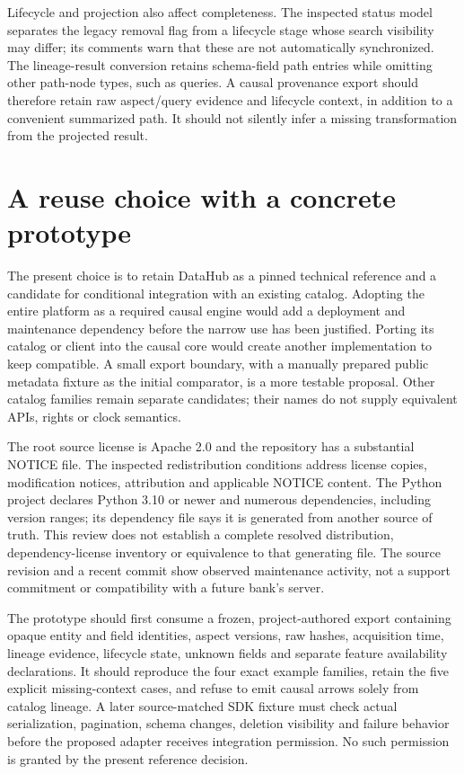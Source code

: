Lifecycle and projection also affect completeness. The inspected status model
separates the legacy removal flag from a lifecycle stage whose search visibility
may differ; its comments warn that these are not automatically synchronized.
The lineage-result conversion retains schema-field path entries while omitting
other path-node types, such as queries. A causal provenance export should
therefore retain raw aspect/query evidence and lifecycle context, in addition
to a convenient summarized path. It should not silently infer a missing
transformation from the projected result. \citep{exec16_dh_primary}

\section{A reuse choice with a concrete prototype}

The present choice is to retain DataHub as a pinned technical reference and
a candidate for conditional integration with an existing catalog. Adopting
the entire platform as a required causal engine would add a deployment and
maintenance dependency before the narrow use has been justified. Porting its
catalog or client into the causal core would create another implementation
to keep compatible. A small export boundary, with a manually prepared public
metadata fixture as the initial comparator, is a more testable proposal.
Other catalog families remain separate candidates; their names do not supply
equivalent APIs, rights or clock semantics. \citep{exec16_dh_contract}

The root source license is Apache 2.0 and the repository has a substantial
NOTICE file. The inspected redistribution conditions address license copies,
modification notices, attribution and applicable NOTICE content. The Python
project declares Python 3.10 or newer and numerous dependencies, including
version ranges; its dependency file says it is generated from another source
of truth. This review does not establish a complete resolved distribution,
dependency-license inventory or equivalence to that generating file. The
source revision and a recent commit show observed maintenance activity, not
a support commitment or compatibility with a future bank's server.
\citep{exec16_dh_rights}

The prototype should first consume a frozen, project-authored export containing
opaque entity and field identities, aspect versions, raw hashes, acquisition
time, lineage evidence, lifecycle state, unknown fields and separate feature
availability declarations. It should reproduce the four exact example families,
retain the five explicit missing-context cases, and refuse to emit causal arrows
solely from catalog lineage. A later source-matched SDK fixture must check
actual serialization, pagination, schema changes, deletion visibility and
failure behavior before the proposed adapter receives integration permission.
No such permission is granted by the present reference decision.
\citep{exec16_dh_contract}

